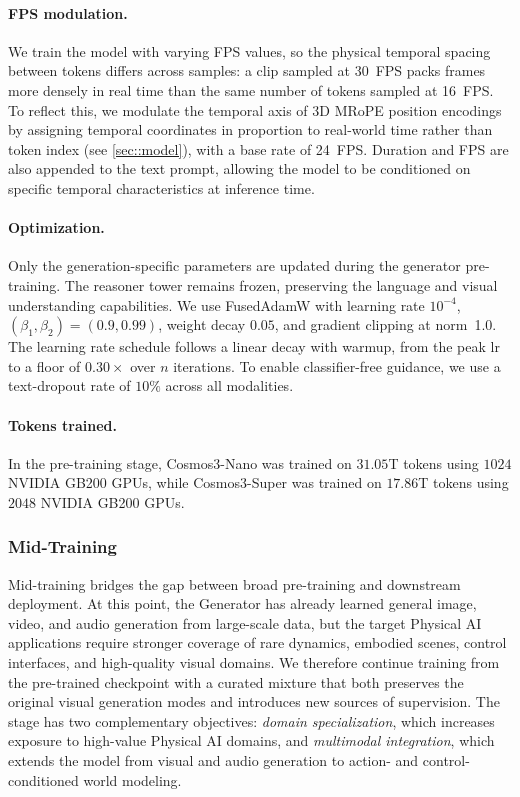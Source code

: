 \paragraph{FPS modulation.}
We train the model with varying FPS values, so the physical temporal spacing between tokens differs across samples: a clip sampled at 30~FPS packs frames more densely in real time than the same number of tokens sampled at 16~FPS. To reflect this, we modulate the temporal axis of 3D MRoPE position encodings by assigning temporal coordinates in proportion to real-world time rather than token index (see \cref{sec::model}), with a base rate of 24~FPS. Duration and FPS are also appended to the text prompt, allowing the model to be conditioned on specific temporal characteristics at inference time.

\paragraph{Optimization.}
Only the generation-specific parameters are updated during the generator pre-training. The reasoner tower remains frozen, preserving the language and visual understanding capabilities. We use FusedAdamW with learning rate $10^{-4}$, $(\beta_1, \beta_2) = (0.9, 0.99)$, weight decay $0.05$, and gradient clipping at norm~1.0. The learning rate schedule follows a linear decay with warmup, from the peak lr to a floor of $0.30\times$ over $n$ iterations. To enable classifier-free guidance, we use a text-dropout rate of $10\%$ across all modalities.

\paragraph{Tokens trained.} In the pre-training stage, Cosmos3-Nano was trained on $31.05$T tokens using $1024$ NVIDIA GB200 GPUs, while Cosmos3-Super was trained on $17.86$T tokens using $2048$ NVIDIA GB200 GPUs.

\subsubsection{Mid-Training}

Mid-training bridges the gap between broad pre-training and downstream deployment. At this point, the Generator has already learned general image, video, and audio generation from large-scale data, but the target Physical AI applications require stronger coverage of rare dynamics, embodied scenes, control interfaces, and high-quality visual domains. We therefore continue training from the pre-trained checkpoint with a curated mixture that both preserves the original visual generation modes and introduces new sources of supervision. The stage has two complementary objectives: \textit{domain specialization}, which increases exposure to high-value Physical AI domains, and \textit{multimodal integration}, which extends the model from visual and audio generation to action- and control-conditioned world modeling.

